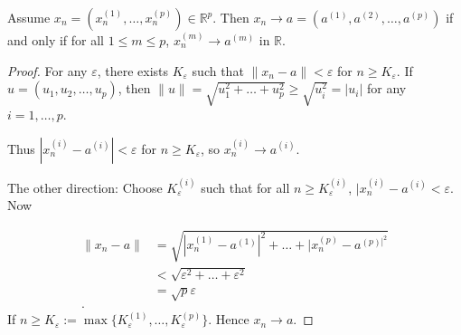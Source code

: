 \begin{theorem}
	Assume $x_n = \left(x_n^{(1)}, \ldots,x_n^{(p)}\right) \in \mathbb{R}^p$. Then $x_n \to a = \left(a^{(1)}, a^{(2)}, \ldots, a^{(p)}\right)$ if and only if for all $1\le m\le p$, $x_n^{(m)} \to a^{(m)}$ in $\mathbb{R}$.
\end{theorem}
\begin{proof}
	For any $\varepsilon$, there exists $K_\varepsilon$ such that $\|x_n - a\|< \varepsilon$ for $n \ge K_\varepsilon$. If $u = (u_1, u_2,\ldots, u_p)$, then $\|u\| = \sqrt{u_1^2 + \ldots + u_p^2} \ge \sqrt{u_i^2}  = |u_i|$ for any $i = 1,\ldots,p$.
	
	Thus $|x_n^{(i)} - a^{(i)}| < \varepsilon$ for $n \ge K_\varepsilon$, so $x_n^{(i)}\to a^{(i)}$.

	The other direction: Choose $K_\varepsilon^{(i)}$ such that for all $n\ge K_\varepsilon^{(i)}$, $|x_n^{(i)} - a^{(i)}< \varepsilon$. Now

	\begin{align*}
		\|x_n - a\|
		&= \sqrt{|x_n^{(1)}-a^{(1)}|^2 + \ldots + |x_n^{(p)}- a^{(p)|^2}}  \\
		&< \sqrt{\varepsilon^2 + \ldots + \varepsilon^2}\\
		&= \sqrt{p}  \varepsilon \\
	.\end{align*}
	If $n \ge K_\varepsilon := \max \{K_\varepsilon^{(1)},\ldots,K_\varepsilon^{(p)}\} $.
	Hence $x_n \to a$.
\end{proof}



